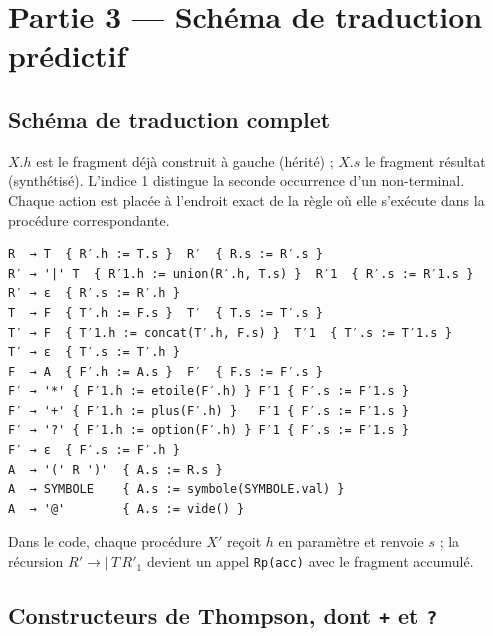 \documentclass[12pt,a4paper]{article}
\newcommand{\code}[1]{{\fontsize{10}{12}\selectfont\texttt{#1}}}
\begin{document}
\section{Partie 3 --- Schéma de traduction prédictif}

\subsection{Schéma de traduction complet}

$X.h$ est le fragment déjà construit à gauche (hérité) ; $X.s$ le fragment résultat
(synthétisé). L'indice 1 distingue la seconde occurrence d'un non-terminal. Chaque action est
placée à l'endroit exact de la règle où elle s'exécute dans la procédure correspondante.

\begin{lstlisting}[style=schema]
R  → T  { R′.h := T.s }  R′  { R.s := R′.s }
R′ → '|' T  { R′1.h := union(R′.h, T.s) }  R′1  { R′.s := R′1.s }
R′ → ε  { R′.s := R′.h }
T  → F  { T′.h := F.s }  T′  { T.s := T′.s }
T′ → F  { T′1.h := concat(T′.h, F.s) }  T′1  { T′.s := T′1.s }
T′ → ε  { T′.s := T′.h }
F  → A  { F′.h := A.s }  F′  { F.s := F′.s }
F′ → '*' { F′1.h := etoile(F′.h) } F′1 { F′.s := F′1.s }
F′ → '+' { F′1.h := plus(F′.h) }   F′1 { F′.s := F′1.s }
F′ → '?' { F′1.h := option(F′.h) } F′1 { F′.s := F′1.s }
F′ → ε  { F′.s := F′.h }
A  → '(' R ')'  { A.s := R.s }
A  → SYMBOLE    { A.s := symbole(SYMBOLE.val) }
A  → '@'        { A.s := vide() }
\end{lstlisting}

Dans le code, chaque procédure $X'$ reçoit $h$ en paramètre et renvoie $s$ ; la récursion
$R' \to \texttt{|}\,T\,R'_1$ devient un appel \code{Rp(acc)} avec le fragment accumulé.

\subsection{Constructeurs de Thompson, dont \texttt{+} et \texttt{?}}\label{sec:constructeurs}
\end{document}
